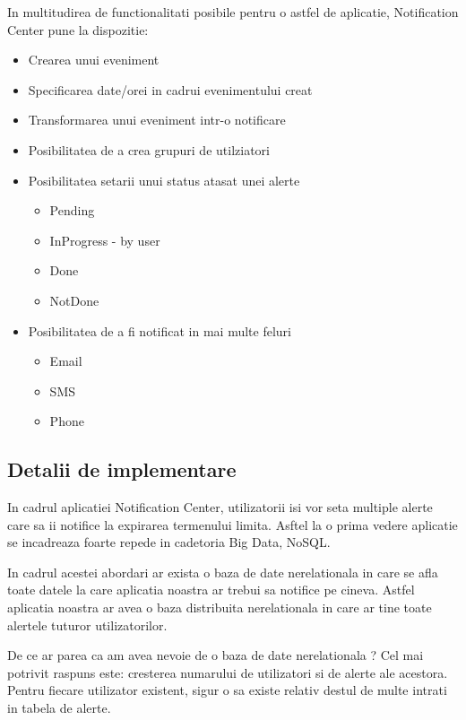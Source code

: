 \documentclass[conference]{IEEEtran}
\begin{document}
In multitudirea de functionalitati posibile pentru o astfel de aplicatie, Notification Center pune la dispozitie:
\begin{itemize}
  \item Crearea unui eveniment
  \item Specificarea date/orei in cadrui evenimentului creat
  \item Transformarea unui eveniment intr-o notificare
  \item Posibilitatea de a crea grupuri de utilziatori
  \item Posibilitatea setarii unui status atasat unei alerte
  \begin{itemize}
  	\item Pending
  	\item InProgress - by user
  	\item Done
  	\item NotDone
  \end{itemize}

  \item Posibilitatea de a fi notificat in mai multe feluri
  \begin{itemize}
  	\item Email
  	\item SMS
  	\item Phone
  \end{itemize}
\end{itemize}

\subsection{Detalii de implementare}

In cadrul aplicatiei Notification Center, utilizatorii isi vor seta multiple alerte care sa ii notifice la expirarea termenului limita. Asftel la o prima vedere aplicatie se incadreaza foarte repede in cadetoria Big Data, NoSQL.

In cadrul acestei abordari ar exista o baza de date nerelationala in care se afla toate datele la care aplicatia noastra ar trebui sa notifice pe cineva. Astfel aplicatia noastra ar avea o baza distribuita nerelationala in care ar tine toate alertele tuturor utilizatorilor. 

De ce ar parea ca am avea nevoie de o baza de date nerelationala ? Cel mai potrivit raspuns este: cresterea numarului de utilizatori si de alerte ale acestora. Pentru fiecare utilizator existent, sigur o sa existe relativ destul de multe intrati in tabela de alerte. 
\end{document}
